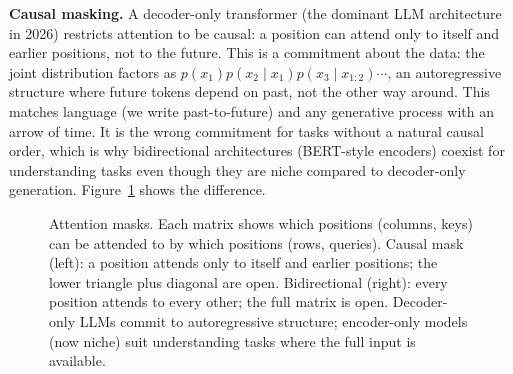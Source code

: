 \textbf{Causal masking.} A decoder-only transformer (the dominant LLM architecture in 2026) restricts attention to be causal: a position can attend only to itself and earlier positions, not to the future. This is a commitment about the data: the joint distribution factors as $p(x_1) p(x_2 \mid x_1) p(x_3 \mid x_{1:2}) \cdots$, an autoregressive structure where future tokens depend on past, not the other way around. This matches language (we write past-to-future) and any generative process with an arrow of time. It is the wrong commitment for tasks without a natural causal order, which is why bidirectional architectures (BERT-style encoders) coexist for understanding tasks even though they are niche compared to decoder-only generation. Figure~\ref{fig:attention-masks} shows the difference.

\begin{figure}[h]
\centering
{}
\caption{Attention masks. Each matrix shows which positions (columns, keys) can be attended to by which positions (rows, queries). Causal mask (left): a position attends only to itself and earlier positions; the lower triangle plus diagonal are open. Bidirectional (right): every position attends to every other; the full matrix is open. Decoder-only LLMs commit to autoregressive structure; encoder-only models (now niche) suit understanding tasks where the full input is available.}
\label{fig:attention-masks}
\end{figure}

